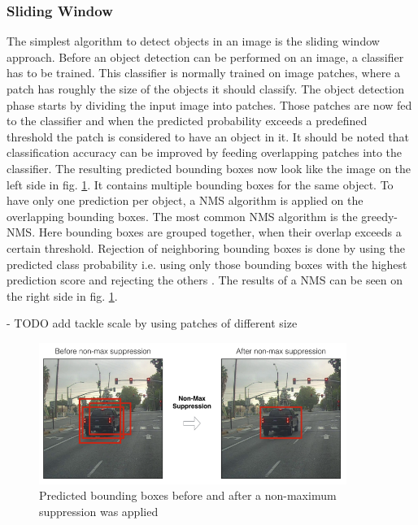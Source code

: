 \subsubsection{Sliding Window}
The simplest algorithm to detect objects in an image is the sliding window approach.
Before an object detection can be performed on an image, a classifier has to be trained.
This classifier is normally trained on image patches, where a patch has roughly the size of the objects it should classify.
The object detection phase starts by dividing the input image into patches.
Those patches are now fed to the classifier and when the predicted probability exceeds a predefined threshold the patch is considered to have an object in it.
It should be noted that classification accuracy can be improved by feeding overlapping patches into the classifier.
The resulting predicted bounding boxes now look like the image on the left side in fig. \ref{fig:nms_before_after}.
It contains multiple bounding boxes for the same object.
To have only one prediction per object, a \ac{NMS} algorithm is applied on the overlapping bounding boxes.
The most common \ac{NMS} algorithm is the greedy-\ac{NMS}.
Here bounding boxes are grouped together, when their overlap exceeds a certain threshold.
Rejection of neighboring bounding boxes is done by using the predicted class probability i.e. using only those bounding boxes with the highest prediction score and rejecting the others \cite{learn_nms}.
The results of a \ac{NMS} can be seen on the right side in fig. \ref{fig:nms_before_after}.


- TODO add tackle scale by using patches of different size

\begin{figure}
\begin{center}
    \includegraphics[width=10cm]{imgs/nms_before_after.png}
    \caption{Predicted bounding boxes before and after a non-maximum suppression was applied \cite{nms_before_after}}
    \label{fig:nms_before_after}
\end{center}
\end{figure}

